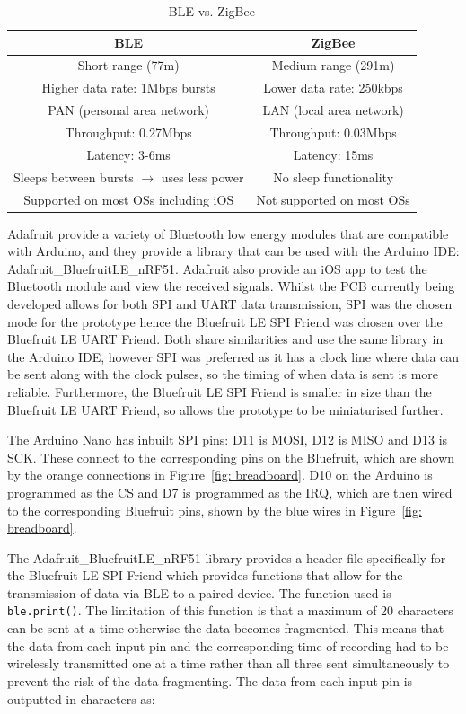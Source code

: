 \begin{table}[h!]
\centering
\begin{tabular}{||c c||} 
 \hline
 BLE & ZigBee \\ [0.5ex] 
 \hline\hline
 Short range (77m) & Medium range (291m) \\
 Higher data rate: 1Mbps bursts & Lower data rate: 250kbps \\ 
 PAN (personal area network) & LAN (local area network) \\
 Throughput: 0.27Mbps & Throughput: 0.03Mbps \\
 Latency: 3-6ms & Latency: 15ms \\
 Sleeps between bursts $\rightarrow$ uses less power & No sleep functionality \\
 Supported on most OSs including iOS & Not supported on most OSs \\
 \hline
\end{tabular}
\caption{BLE vs. ZigBee \cite{Ray2015, Christiano}}
\label{table:BLE vs ZigBee}
\end{table}

Adafruit provide a variety of Bluetooth low energy modules that are compatible with Arduino, and they provide a library that can be used with the Arduino IDE: Adafruit\_BluefruitLE\_nRF51. Adafruit also provide an iOS app to test the Bluetooth module and view the received signals. Whilst the PCB currently being developed allows for both SPI and UART data transmission, SPI was the chosen mode for the prototype hence the Bluefruit LE SPI Friend was chosen over the Bluefruit LE UART Friend. Both share similarities and use the same library in the Arduino IDE, however SPI was preferred as it has a clock line where data can be sent along with the clock pulses, so the timing of when data is sent is more reliable. Furthermore, the Bluefruit LE SPI Friend is smaller in size than the Bluefruit LE UART Friend, so allows the prototype to be miniaturised further. 

The Arduino Nano has inbuilt SPI pins: D11 is MOSI, D12 is MISO and D13 is SCK. These connect to the corresponding pins on the Bluefruit, which are shown by the orange connections in Figure~\ref{fig: breadboard}. D10 on the Arduino is programmed as the CS and D7 is programmed as the IRQ, which are then wired to the corresponding Bluefruit pins, shown by the blue wires in Figure~\ref{fig: breadboard}. 

The Adafruit\_BluefruitLE\_nRF51 library provides a header file specifically for the Bluefruit LE SPI Friend which provides functions that allow for the transmission of data via BLE to a paired device. The function used is {\tt{ble.print()}}. The limitation of this function is that a maximum of 20 characters can be sent at a time otherwise the data becomes fragmented. This means that the data from each input pin and the corresponding time of recording had to be wirelessly transmitted one at a time rather than all three sent simultaneously to prevent the risk of the data fragmenting. The data from each input pin is outputted in characters as:

